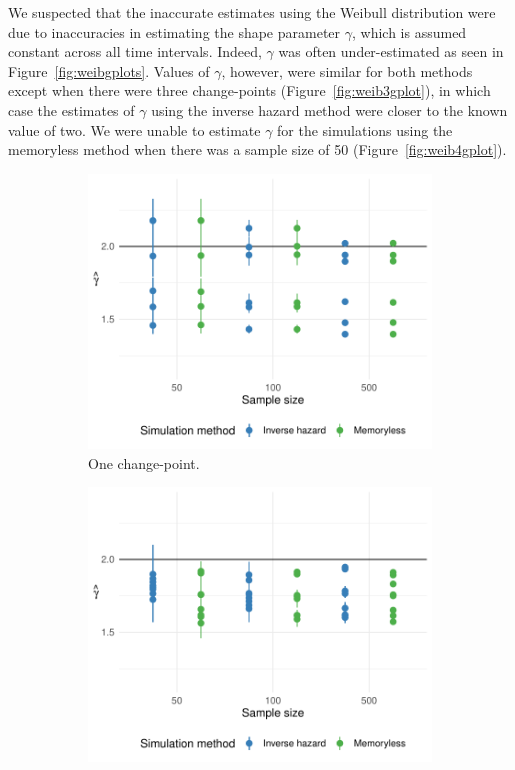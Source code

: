 We suspected that the inaccurate estimates using the Weibull distribution were due to inaccuracies in estimating the shape parameter $\gamma$, which is assumed constant across all time intervals. Indeed, $\gamma$ was often under-estimated as seen in Figure~\ref{fig:weibgplots}. Values of $\gamma$, however, were similar for both methods except when there were three change-points (Figure~\ref{fig:weib3gplot}), in which case the estimates of $\gamma$ using the inverse hazard method were closer to the known value of two. We were unable to estimate $\gamma$ for the simulations using the memoryless method when there was a sample size of 50 (Figure~\ref{fig:weib4gplot}). 

\begin{figure}[ht]
    \centering
     \begin{subfigure}[b]{0.45\textwidth}
         \centering
         \includegraphics[width=\textwidth]{weib1_gplot.pdf}
         \caption{One change-point.}
         \label{fig:weib1gplot}
     \end{subfigure}
     \hfill
    \begin{subfigure}[b]{0.45\textwidth}
         \centering
         \includegraphics[width=\textwidth]{weib2_gplot.pdf}

\end{subfigure}
\end{figure}
